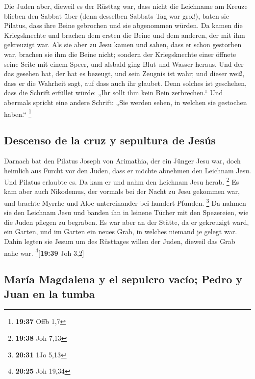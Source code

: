  Die Juden aber, dieweil es der Rüsttag war, dass nicht
die Leichname am Kreuze blieben den Sabbat über (denn desselben Sabbats
Tag war groß), baten sie Pilatus, dass ihre Beine gebrochen und sie
abgenommen würden.  Da kamen die Kriegsknechte und
brachen dem ersten die Beine und dem anderen, der mit ihm gekreuzigt
war.  Als sie aber zu Jesu kamen und sahen, dass er schon
gestorben war, brachen sie ihm die Beine nicht;  sondern
der Kriegsknechte einer öffnete seine Seite mit einem Speer, und alsbald
ging Blut und Wasser heraus.  Und der das gesehen hat,
der hat es bezeugt, und sein Zeugnis ist wahr; und dieser weiß, dass er
die Wahrheit sagt, auf dass auch ihr glaubet.  Denn
solches ist geschehen, dass die Schrift erfüllet würde: „Ihr sollt ihm
kein Bein zerbrechen.``  Und abermals spricht eine andere
Schrift: „Sie werden sehen, in welchen sie gestochen haben.``
\footnote{\textbf{19:37} Offb 1,7}

\hypertarget{descenso-de-la-cruz-y-sepultura-de-jesuxfas}{%
\subsection{Descenso de la cruz y sepultura de
Jesús}\label{descenso-de-la-cruz-y-sepultura-de-jesuxfas}}

 Darnach bat den Pilatus Joseph von Arimathia, der ein
Jünger Jesu war, doch heimlich aus Furcht vor den Juden, dass er möchte
abnehmen den Leichnam Jesu. Und Pilatus erlaubte es. Da kam er und nahm
den Leichnam Jesu herab. \footnote{\textbf{19:38} Joh 7,13}
 Es kam aber auch Nikodemus, der vormals bei der Nacht zu
Jesu gekommen war, und brachte Myrrhe und Aloe untereinander bei hundert
Pfunden. \footnote{\textbf{20:31} 1Jo 5,13}  Da nahmen
sie den Leichnam Jesu und banden ihn in leinene Tücher mit den
Spezereien, wie die Juden pflegen zu begraben.  Es war
aber an der Stätte, da er gekreuzigt ward, ein Garten, und im Garten ein
neues Grab, in welches niemand je gelegt war.  Dahin
legten sie Jesum um des Rüsttages willen der Juden, dieweil das Grab
nahe war. \footnote{\textbf{20:25} Joh 19,34}{[}\textbf{19:39} Joh
3,2{]}

\hypertarget{maruxeda-magdalena-y-el-sepulcro-vacuxedo-pedro-y-juan-en-la-tumba}{%
\subsection{María Magdalena y el sepulcro vacío; Pedro y Juan en la
tumba}\label{maruxeda-magdalena-y-el-sepulcro-vacuxedo-pedro-y-juan-en-la-tumba}}

